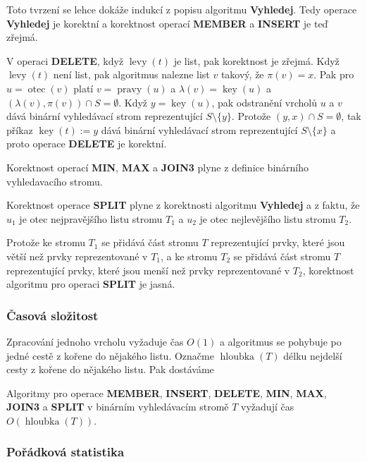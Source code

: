 \documentclass[a4paper,12pt]{article}
\DeclareMathOperator*{\otec}{otec}
\DeclareMathOperator*{\levy}{levy}
\DeclareMathOperator*{\pravy}{pravy}
\DeclareMathOperator*{\key}{key}
\DeclareMathOperator*{\hloubka}{hloubka}
\begin{document}
Toto tvrzení se lehce dokáže indukcí z popisu algoritmu 
{\bf Vy\-hledej}.  Tedy operace {\bf Vy\-hledej} je korektní a korekt\-nost 
ope\-rací {\bf MEMBER} a {\bf INSERT} je teď zřejmá. 

V operaci {\bf DELE\-TE},  
když $\levy(t)$ je list, pak korektnost je zřejmá. Když $\levy
(t)$ 
není list, pak algoritmus nalezne list $v$ takový, že $\pi(v)=x$. 
Pak pro $u=\otec(v)$ platí $v=\pravy(u)$ a $\lambda(v)=\key(u)$ a 
$(\lambda(v),\pi(v))\cap S=\emptyset$. Když $y=\key(u)$, pak 
odstranění vrcholů $u$ a $v$ dává binární vyhledávací strom reprezentující $S\setminus \{y\}$. 
Protože $(y,x)\cap S=\emptyset$, tak příkaz $\key(t):=y$ dává binární 
vyhledávací strom reprezentující $S\setminus \{x\}$ a proto operace 
{\bf DELETE} je korektní. 

Korektnost operací {\bf MIN}, {\bf MAX} a {\bf JOIN3} plyne z definice 
binárního vyhledavacího stromu.  

Korektnost operace {\bf SPLIT }
plyne z korektnosti algoritmu {\bf Vyhledej} a z faktu, že $u_
1$ je otec 
nej\-pravějšího listu stromu $T_1$ a $u_2$ je otec nejlevějšího listu stromu $T_2$.  


Protože ke stromu $T_1$ se přidává část stromu $T$ reprezentující 
prvky, které jsou větší než prvky reprezentované v $
T_1$, a ke 
stromu $T_2$ se přidává část stromu $T$ reprezentující prvky, 
které jsou menší než prvky reprezentované v $T_2$, korektnost 
algoritmu pro operaci {\bf SPLIT} je jasná.  

\subsubsection{Časová složitost}


Zpracování jednoho vrcholu vyžaduje čas $O(
1)$ a 
algoritmus se pohybuje po jedné cestě z kořene do 
nějakého listu. Označme $\hloubka(T)$ délku nejdelší cesty 
z kořene do nějakého listu. Pak dostáváme

\begin{veta}Algoritmy pro operace {\bf MEMBER}, {\bf INSERT}, {\bf DE\-LE\-TE}, {\bf MIN}, {\bf MAX}, 
{\bf JOIN3} a {\bf SPLIT} v binár\-ním vy\-hledá\-va\-cím stro\-mě $
T$ vyžadují 
čas $O(\hloubka(T))$. 
\end{veta}

\subsubsection{Pořádková statistika}
\end{document}
